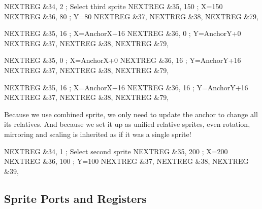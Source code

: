 \begin{tcblisting}{}
    NEXTREG &34, 2              ; Select third sprite
    NEXTREG &35, 150            ; X=150
    NEXTREG &36, 80             ; Y=80
    NEXTREG &37, %
    NEXTREG &38, %
    NEXTREG &79, %

    NEXTREG &35, 16             ; X=AnchorX+16
    NEXTREG &36, 0              ; Y=AnchorY+0
    NEXTREG &37, %
    NEXTREG &38, %
    NEXTREG &79, %

    NEXTREG &35, 0              ; X=AnchorX+0
    NEXTREG &36, 16             ; Y=AnchorY+16
    NEXTREG &37, %
    NEXTREG &38, %
    NEXTREG &79, %

    NEXTREG &35, 16             ; X=AnchorX+16
    NEXTREG &36, 16             ; Y=AnchorY+16
    NEXTREG &37, %
    NEXTREG &38, %
    NEXTREG &79, %
\end{tcblisting}

Because we use combined sprite, we only need to update the anchor to change all its relatives. And because we set it up as unified relative sprites, even rotation, mirroring and scaling is inherited as if it was a single sprite!

\begin{tcblisting}{}
    NEXTREG &34, 1              ; Select second sprite
    NEXTREG &35, 200            ; X=200
    NEXTREG &36, 100            ; Y=100
    NEXTREG &37, %
    NEXTREG &38, %
    NEXTREG &39, %
\end{tcblisting}


\pagebreak
\subsection{Sprite Ports and Registers}
\label{zx_next_sprites_registers}

\subsubsection{}

